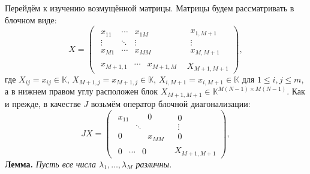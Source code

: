 \documentclass[12pt]{article}
\begin{document}
Перейдём к изучению возмущённой матрицы.
Матрицы будем рассматривать в блочном виде:
\[
    X =
        \left(\begin{array}{c|c}
            \begin{matrix}
                x_{11} & \cdots & x_{1M} \\
                \vdots & \ddots & \vdots \\
                x_{M1} & \cdots & x_{MM}
            \end{matrix} &
            \begin{matrix}
                x_{1,M+1} \\
                \vdots \\
                x_{M,M+1}
            \end{matrix} \\ \hline
            \begin{matrix}
                x_{M+1,1} &
                \cdots &
                x_{M+1,M}
            \end{matrix} &
            X_{M+1,M+1}
        \end{array}\right),
    \]
где
\( X_{ij}      {=} x_{ij}      {\in} \mathbb{K} \),
\( X_{M{+}1,j} {=} x_{M{+}1,j} {\in} \mathbb{K} \),
\( X_{i,M{+}1} {=} x_{i,M{+}1} {\in} \mathbb{K} \)
для \( 1\leq i,j \leq m \),
а в нижнем правом углу расположен блок
\( X_{M{+}1,M{+}1} {\in} \mathbb{K}^{M(N{-}1){\times}M(N-1)} \).
Как и прежде, в качестве \( J \)
возьмём оператор блочной диагонализации:
\[
    J X =
        \left(\begin{array}{c|c}
            \begin{matrix}
                x_{11} &  & 0 \\
                 & \ddots &  \\
                0 &  & x_{MM}
            \end{matrix} &
            \begin{matrix}
                0 \\
                \vdots \\
                0
            \end{matrix} \\ \hline
            \begin{matrix}
                0 & \cdots & 0
            \end{matrix} &
            X_{M+1,M+1}
        \end{array}\right),
    \]
\begingroup
\textbf{Лемма.}\itshape
    Пусть все числа \( \lambda_1, \ldots, \lambda_M \) различны.
\end{document}
